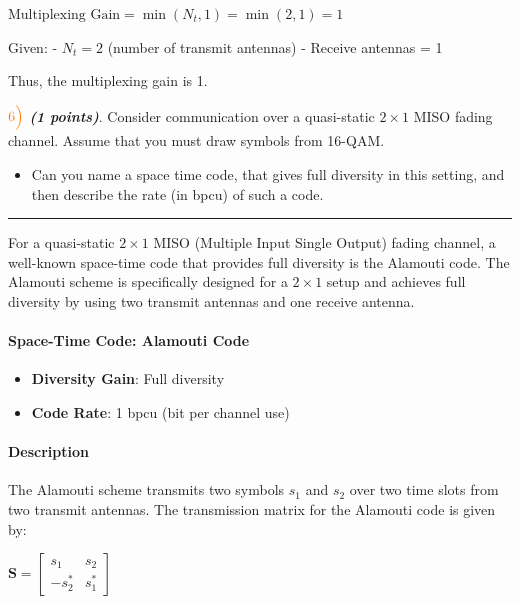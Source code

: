 \documentclass[11pt]{article}
\providecommand{\tightlist}{%
      \setlength{\itemsep}{0pt}\setlength{\parskip}{0pt}}
\begin{document}
\(\text{Multiplexing Gain} = \min(N_t, 1) = \min(2, 1) = 1\)

Given: - \(N_t = 2\) (number of transmit antennas) - Receive antennas =
1

Thus, the multiplexing gain is 1.

    \(\color{orange}6\Bigl)\) \textbf{\emph{(1 points)}}. Consider
communication over a quasi-static \(2 \times 1\) MISO fading channel.
Assume that you must draw symbols from 16-QAM.

\begin{itemize}
\tightlist
\item
  Can you name a space time code, that gives full diversity in this
  setting, and then describe the rate (in bpcu) of such a code.
\end{itemize}

    \begin{center}\rule{0.5\linewidth}{0.5pt}\end{center}

For a quasi-static \(2 \times 1\) MISO (Multiple Input Single Output)
fading channel, a well-known space-time code that provides full
diversity is the Alamouti code. The Alamouti scheme is specifically
designed for a \(2 \times 1\) setup and achieves full diversity by using
two transmit antennas and one receive antenna.

\paragraph{Space-Time Code: Alamouti
Code}\label{space-time-code-alamouti-code}

\begin{itemize}
\tightlist
\item
  \textbf{Diversity Gain}: Full diversity
\item
  \textbf{Code Rate}: 1 bpcu (bit per channel use)
\end{itemize}

\paragraph{Description}\label{description}

The Alamouti scheme transmits two symbols \(s_1\) and \(s_2\) over two
time slots from two transmit antennas. The transmission matrix for the
Alamouti code is given by:

\(\mathbf{S} = \begin{bmatrix} s_1 & s_2 \\ -s_2^* & s_1^* \end{bmatrix}\)
\end{document}
